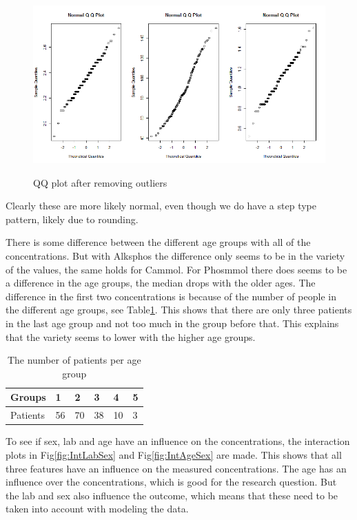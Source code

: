 \documentclass{article}
\begin{document}
	\begin{figure}[H]
		\centering
		{\includegraphics[scale=0.4]{../results/dat2_qq.png}}
		\caption{QQ plot after removing outliers}
		\label{fig:qq2}
	\end{figure}
	
	Clearly these are more likely normal, even though we do have a step type pattern, likely due to rounding.
	
      There is some difference between the different age groups with all of the concentrations.
      But with Alksphos the difference only seems to be in the variety of the values, the same holds for Cammol.
      For Phosmmol there does seems to be a difference in the age groups, the median drops with the older ages.
      The difference in the first two concentrations is because of the number of people in the different age groups, see Table\ref{table:Agegrp}.
      This shows that there are only three patients in the last age group and not too much in the group before that.
      This explains that the variety seems to lower with the higher age groups.
      
      \begin{table}[H]
        \begin{center}
          \begin{tabular}{|l|lllll|}
          \hline
          Groups&1&2&3&4&5\\
          \hline
          Patients&56&70&38&10&3\\
          \hline
          \end{tabular}
        \end{center}
        \caption{The number of patients per age group}
        \label{table:Agegrp}
      \end{table}

      To see if sex, lab and age have an influence on the concentrations, the interaction plots in Fig\ref{fig:IntLabSex} and Fig\ref{fig:IntAgeSex} are made.
      This shows that all three features have an influence on the measured concentrations.
      The age has an influence over the concentrations, which is good for the research question. 
      But the lab and sex also influence the outcome, which means that these need to be taken into account with modeling the data.
\end{document}
